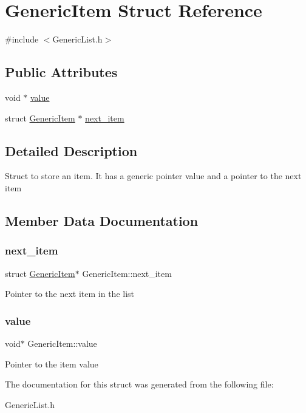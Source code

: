 \hypertarget{structGenericItem}{}\section{Generic\+Item Struct Reference}
\label{structGenericItem}


{\ttfamily \#include $<$Generic\+List.\+h$>$}

\subsection*{Public Attributes}
\begin{DoxyCompactItemize}
\item 
void $\ast$ \mbox{\hyperlink{structGenericItem_a292cf48b44c9f57e518198387525eb33}{value}}
\item 
struct \mbox{\hyperlink{structGenericItem}{Generic\+Item}} $\ast$ \mbox{\hyperlink{structGenericItem_a1b98ceb4a61ebe94fcc3d85fb5c7d765}{next\+\_\+item}}
\end{DoxyCompactItemize}


\subsection{Detailed Description}
Struct to store an item. It has a generic pointer value and a pointer to the next item 

\subsection{Member Data Documentation}
\mbox{\label{structGenericItem_a1b98ceb4a61ebe94fcc3d85fb5c7d765}} 
\subsubsection{\texorpdfstring{next\+\_\+item}{next\_item}}
{\footnotesize\ttfamily struct \mbox{\hyperlink{structGenericItem}{Generic\+Item}}$\ast$ Generic\+Item\+::next\+\_\+item}

Pointer to the next item in the list \mbox{\label{structGenericItem_a292cf48b44c9f57e518198387525eb33}} 
\subsubsection{\texorpdfstring{value}{value}}
{\footnotesize\ttfamily void$\ast$ Generic\+Item\+::value}

Pointer to the item value 

The documentation for this struct was generated from the following file\+:\begin{DoxyCompactItemize}
\item 
Generic\+List.\+h\end{DoxyCompactItemize}

